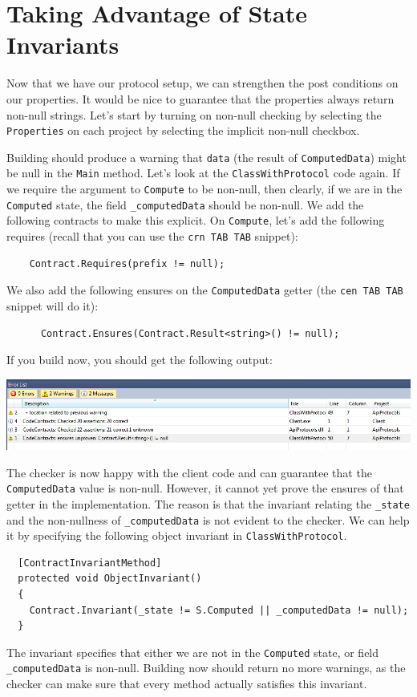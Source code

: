 \documentclass{article}
\newcommand{\code}[1]{\lstinline{#1}}
\begin{document}
\section{Taking Advantage of State Invariants}
Now that we have our protocol setup, we can strengthen the post
conditions on our properties. It would be nice to guarantee that the
properties always return non-null strings. Let's start by turning on
non-null checking by selecting the \code{Properties} on each project
by selecting the implicit non-null checkbox.

Building should produce a warning that \code{data} (the result of
\code{ComputedData}) might be null in the \code{Main} method.
Let's look at the \code{ClassWithProtocol} code again. If we require
the argument to \code{Compute} to be non-null, then clearly, if we
are in the \code{Computed} state, the field \code{_computedData}
should be non-null. We add the following contracts to make this
explicit. On \code{Compute}, let's add the following requires (recall
that you can use the \code{crn TAB TAB} snippet):
\begin{lstlisting}
    Contract.Requires(prefix != null);
\end{lstlisting}
We also add the following ensures on the \code{ComputedData} getter
(the \code{cen TAB TAB} snippet will do it):
\begin{lstlisting}
      Contract.Ensures(Contract.Result<string>() != null);
\end{lstlisting}
If you build now, you should get the following output:
\begin{center}
  \includegraphics[width=1\columnwidth]{errors4.png}
\end{center}
The checker is now happy with the client code and can guarantee that
the \code{ComputedData} value is non-null. However, it cannot yet
prove the ensures of that getter in the implementation. The reason is
that the invariant relating the \code{_state} and the non-nullness of
\code{_computedData} is not evident to the checker. We can help it by
specifying the following object invariant in \code{ClassWithProtocol}.
\begin{lstlisting}
  [ContractInvariantMethod]
  protected void ObjectInvariant()
  {
    Contract.Invariant(_state != S.Computed || _computedData != null);
  }
\end{lstlisting}
The invariant specifies that either we are not in the \code{Computed}
state, or field \code{_computedData} is non-null. Building now should
return no more warnings, as the checker can make sure that every
method actually satisfies this invariant.
\end{document}

